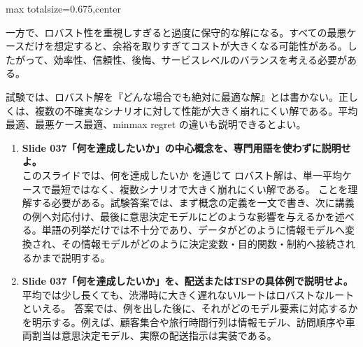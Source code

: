 \begin{adjustbox}{max totalsize={\textwidth}{0.675\textheight},center}
\begin{minipage}{\textwidth}
\begin{minipage}[t]{0.485\textwidth}
一方で、ロバスト性を重視しすぎると過度に保守的な解になる。すべての最悪ケースだけを想定すると、余裕を取りすぎてコストが大きくなる可能性がある。したがって、効率性、信頼性、後悔、サービスレベルのバランスを考える必要がある。\par
試験では、ロバスト解を『どんな場合でも絶対に最適な解』とは書かない。正しくは、複数の不確実なシナリオに対して性能が大きく崩れにくい解である。平均最適、最悪ケース最適、minmax regret の違いも説明できるとよい。\par
{}
\begin{enumerate}
\item \textbf{Slide 037「何を達成したいか」の中心概念を、専門用語を使わずに説明せよ。}\\このスライドでは、何を達成したいか を通じて ロバスト解は、単一平均ケースで最短ではなく、複数シナリオで大きく崩れにくい解である。 ことを理解する必要がある。試験答案では、まず概念の定義を一文で書き、次に講義の例へ対応付け、最後に意思決定モデルにどのような影響を与えるかを述べる。単語の列挙だけでは不十分であり、データがどのように情報モデルへ変換され、その情報モデルがどのように決定変数・目的関数・制約へ接続されるかまで説明する。
\item \textbf{Slide 037「何を達成したいか」を、配送またはTSPの具体例で説明せよ。}\\平均では少し長くても、渋滞時に大きく遅れないルートはロバストなルートといえる。 答案では、例を出した後に、それがどのモデル要素に対応するかを明示する。例えば、顧客集合や旅行時間行列は情報モデル、訪問順序や車両割当は意思決定モデル、実際の配送指示は実装である。
\end{enumerate}
\end{minipage}
\end{minipage}
\end{adjustbox}

